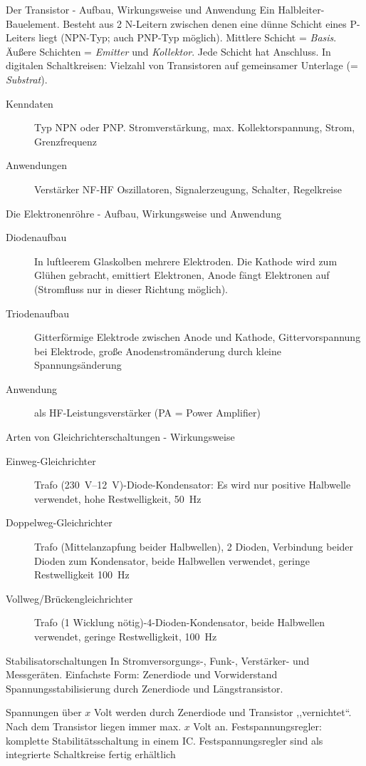 \documentclass[avery5371,grid,frame,a4paper]{flashcards}
\newcommand{\card}[3]{
  \begin{flashcard}[{\chap} -- #1]{#2}#3\end{flashcard}
}
\begin{document}
\card{24}{Der Transistor - Aufbau, Wirkungsweise und Anwendung}{
  \small
  Ein Halbleiter-Bauelement.
  Besteht aus 2 N-Leitern zwischen denen eine dünne Schicht eines P-Leiters liegt (NPN-Typ; auch PNP-Typ möglich).
  Mittlere Schicht = \emph{Basis}.
  Äußere Schichten = \emph{Emitter} und \emph{Kollektor}. Jede Schicht hat Anschluss.
  In digitalen Schaltkreisen: Vielzahl von Transistoren auf gemeinsamer Unterlage (= \emph{Substrat}).

  \begin{description}
    \item[Kenndaten] Typ NPN oder PNP. Stromverstärkung, max. Kollektorspannung, Strom, Grenzfrequenz
    \item[Anwendungen] Verstärker NF-HF Oszillatoren, Signalerzeugung, Schalter, Regelkreise
  \end{description}
}
\card{25}{Die Elektronenröhre - Aufbau, Wirkungsweise und Anwendung}{
  \small
  \begin{description}
    \item[Diodenaufbau]
      In luftleerem Glaskolben mehrere Elektroden.
      Die Kathode wird zum Glühen gebracht, emittiert Elektronen, Anode fängt Elektronen auf (Stromfluss nur in dieser Richtung möglich).
    \item[Triodenaufbau]
      Gitterförmige Elektrode zwischen Anode und Kathode, Gittervorspannung bei Elektrode, große Anodenstromänderung durch kleine Spannungsänderung
    \item[Anwendung] als HF-Leistungsverstärker (PA = Power Amplifier)
  \end{description}
}
\card{26}{Arten von Gleichrichterschaltungen - Wirkungsweise}{
  \small
  \begin{description}
    \item[Einweg-Gleichrichter]
      Trafo (\SIrange{230}{12}{\volt})-Diode-Kondensator:
      Es wird nur positive Halbwelle verwendet, hohe Restwelligkeit, \SI{50}{\Hz}
    \item[Doppelweg-Gleichrichter]
      Trafo (Mittelanzapfung beider Halbwellen),
      2 Dioden,
      Verbindung beider Dioden zum Kondensator,
      beide Halbwellen verwendet, geringe Restwelligkeit \SI{100}{\Hz}
    \item[Vollweg/Brückengleichrichter]
      Trafo (1 Wicklung nötig)-4-Dioden-Kondensator,
      beide Halbwellen verwendet, geringe Restwelligkeit, \SI{100}{\Hz}
  \end{description}
}
\card{27}{Stabilisatorschaltungen}{
  In Stromversorgungs-, Funk-, Verstärker- und Messgeräten.
  Einfachste Form: Zenerdiode und Vorwiderstand Spannungsstabilisierung durch Zenerdiode und Längstransistor.

  Spannungen über $x$ Volt werden durch Zenerdiode und Transistor ,,vernichtet``.
  Nach dem Transistor liegen immer max. $x$ Volt an.
  Festspannungsregler: komplette Stabilitätsschaltung in einem IC.
  Festspannungsregler sind als integrierte Schaltkreise fertig erhältlich
}
\end{document}
